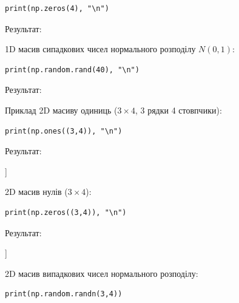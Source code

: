 \begin{lstlisting}
print(np.zeros(4), "\n")
\end{lstlisting}

Результат:

\begin{console}
[0. 0. 0. 0.] 
\end{console}


1D масив сипадкових чисел нормального розподілу $N(0, 1)$:

\begin{lstlisting}
print(np.random.rand(40), "\n")
\end{lstlisting}

Результат:

\begin{console}
[0.18507018 0.46626434 0.9801947  0.0827781  0.57378447 0.56871301
 0.84269999 0.6657426  0.56345543 0.93262208 0.98343751 0.30900493
 0.38287176 0.01312199 0.23539386 0.15844975 0.90519996 0.26924736
 0.85669799 0.94183472 0.011728   0.63333182 0.80378177 0.64861789
 0.02308254 0.69805843 0.52183114 0.61711567 0.95150433 0.2085504
 0.76690385 0.1997735  0.45904879 0.81617043 0.62357921 0.8821446
 0.56465777 0.09903507 0.66269635 0.09785717]
\end{console}

Приклад 2D масиву одиниць ($3\times 4$, 3 рядки 4 стовпчики):

\begin{lstlisting}
print(np.ones((3,4)), "\n")
\end{lstlisting}

Результат:

\begin{console}
[[1. 1. 1. 1.]
 [1. 1. 1. 1.]
 [1. 1. 1. 1.]] 
\end{console}




2D масив нулів ($3\times 4$):

\begin{lstlisting}
print(np.zeros((3,4)), "\n")
\end{lstlisting}

Результат:

\begin{console}
[[0. 0. 0. 0.]
 [0. 0. 0. 0.]
 [0. 0. 0. 0.]] 
\end{console}



2D масив випадкових чисел нормального розподілу:

\begin{lstlisting}
print(np.random.randn(3,4)) 
\end{lstlisting}

